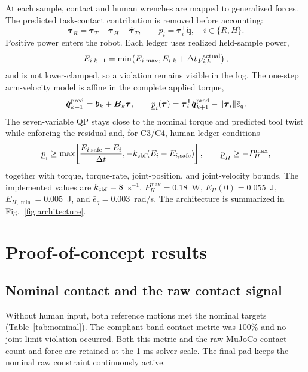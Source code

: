 \documentclass[11pt]{article}
\newcommand{\vect}[1]{\boldsymbol{#1}}
\begin{document}
At each sample, contact and human wrenches are mapped to generalized forces.
The predicted task-contact contribution is removed before accounting:
\begin{equation}
\vect\tau_R=\vect\tau_T+\vect\tau_H-\widehat{\vect\tau}_T,
\qquad
p_i=\vect\tau_i^{\mathsf T}\dot{\vect q},
\quad i\in\{R,H\}.
\end{equation}
Positive power enters the robot. Each ledger uses realized held-sample power,
\begin{equation}
E_{i,k+1}=\min\!\left(E_{i,\max},E_{i,k}+\Delta t\,p_{i,k}^{\rm actual}\right),
\end{equation}
and is not lower-clamped, so a violation remains visible in the log. The
one-step arm-velocity model is affine in the complete applied torque,
\begin{equation}
\dot{\vect q}_{k+1}^{\rm pred}=\vect b_k+\vect B_k\vect\tau,
\qquad
\underline p_i(\vect\tau)=
\vect\tau_i^{\mathsf T}\dot{\vect q}_{k+1}^{\rm pred}
-\lVert\vect\tau_i\rVert\bar e_q .
\end{equation}
The seven-variable QP stays close to the nominal torque and predicted tool
twist while enforcing the residual and, for C3/C4, human-ledger conditions
\begin{equation}
\underline p_i\ge
\max\!\left[
\frac{E_{i,\rm safe}-E_i}{\Delta t},
-k_{\rm cbf}(E_i-E_{i,\rm safe})
\right],
\qquad
\underline p_H\ge-P_H^{\max},
\end{equation}
together with torque, torque-rate, joint-position, and joint-velocity bounds.
The implemented values are $k_{\rm cbf}=8$~s$^{-1}$,
$P_H^{\max}=0.18$~W, $E_H(0)=0.055$~J,
$E_{H,\min}=0.005$~J, and $\bar e_q=0.003$~rad/s. The architecture is
summarized in Fig.~\ref{fig:architecture}.

\FloatBarrier
\section{Proof-of-concept results}

\subsection{Nominal contact and the raw contact signal}

Without human input, both reference motions met the nominal targets
(Table~\ref{tab:nominal}). The compliant-band contact metric was 100\% and no
joint-limit violation occurred. Both this metric and the raw MuJoCo contact
count and force are retained at the 1-ms solver scale. The final pad keeps the
nominal raw constraint continuously active.
\end{document}
